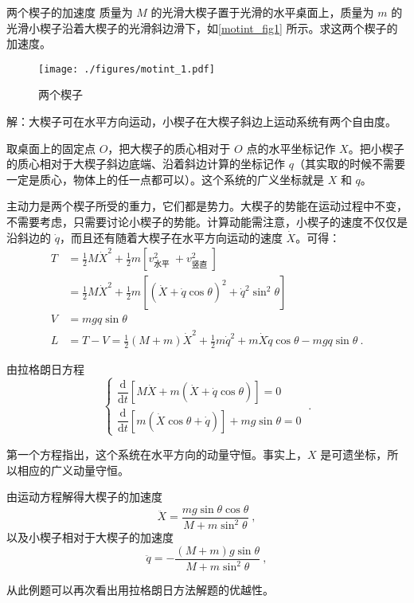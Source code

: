 \begin{example}{两个楔子的加速度}
质量为 $M$ 的光滑大楔子置于光滑的水平桌面上，质量为 $m$ 的光滑小楔子沿着大楔子的光滑斜边滑下，如\autoref{motint_fig1} 所示。求这两个楔子的加速度。
\begin{figure}[ht]
\centering
\texttt{[image: ./figures/motint\_1.pdf]}
\caption{两个楔子} \label{motint_fig1}
\end{figure}

解：大楔子可在水平方向运动，小楔子在大楔子斜边上运动系统有两个自由度。

取桌面上的固定点 $O$，把大楔子的质心相对于 $O$ 点的水平坐标记作 $X $。把小楔子的质心相对于大楔子斜边底端、沿着斜边计算的坐标记作 $q$（其实取的时候不需要一定是质心，物体上的任一点都可以）。这个系统的广义坐标就是 $X $ 和 $q $。

主动力是两个楔子所受的重力，它们都是势力。大楔子的势能在运动过程中不变，不需要考虑，只需要讨论小楔子的势能。计算动能需注意，小楔子的速度不仅仅是沿斜边的 $\dot q$，而且还有随着大楔子在水平方向运动的速度 $\dot X$。可得：
\begin{equation}
\begin{aligned} T &=\frac{1}{2} M \dot{X}^{2}+\frac{1}{2} m\left[v_{\text {水平 }}^{2}+v_{\text {竖直 }}^{2}\right] \\ &=\frac{1}{2} M \dot{X}^{2}+\frac{1}{2} m\left[(\dot{X}+\dot{q} \cos \theta)^{2}+\dot{q}^{2} \sin ^{2} \theta\right] \\ V &=m g q \sin \theta \\ L &=T-V=\frac{1}{2}(M+m) \dot{X}^{2}+\frac{1}{2} m \dot{q}^{2}+m \dot{X} \dot{q} \cos \theta-m g q \sin \theta~. \end{aligned}
\end{equation}

由拉格朗日方程
\begin{equation}
\begin{cases}
\dfrac{\mathrm{d}}{\mathrm{d} t}[M \dot{X}+m(\dot{X}+\dot{q} \cos \theta)]=0 \\ \dfrac{\mathrm{d}}{\mathrm{d} t}[m(\dot{X} \cos \theta+\dot{q})]+m g \sin \theta=0
\end{cases}~.
\end{equation}

第一个方程指出，这个系统在水平方向的动量守恒。事实上，$X$ 是可遗坐标，所以相应的广义动量守恒。

由运动方程解得大楔子的加速度
\begin{equation}
\ddot{X}=\frac{m g \sin \theta \cos \theta}{M+m \sin ^{2} \theta}~,
\end{equation}
以及小楔子相对于大楔子的加速度
\begin{equation}
\ddot{q}=-\frac{(M+m) g \sin \theta}{M+m \sin ^{2} \theta}~,
\end{equation}
\end{example}
从此例题可以再次看出用拉格朗日方法解题的优越性。

